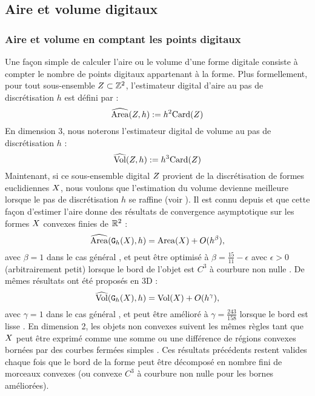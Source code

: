\subsection{Aire et volume digitaux}
%
\subsubsection{Aire et volume en comptant les points digitaux}
\label{sec:AreaByCounting}
Une façon simple de calculer l'aire ou le volume d'une forme digitale consiste à
compter le nombre de points digitaux appartenant à la forme. Plus formellement,
pour tout sous-ensemble $Z \subset \mathbb{Z}^2$, l'estimateur digital d'aire au pas
de discrétisation $h$ est défini par :
%
\begin{equation}
  \widehat{\mathrm{Area}}(Z, h) := h^2 \mathrm{Card}(Z)
\end{equation}
%
En dimension $3$, nous noterons l'estimateur digital de volume au pas de
discrétisation $h$ :
%
\begin{equation}
  \widehat{\mathrm{Vol}}(Z, h) := h^3 \mathrm{Card}(Z)
\end{equation}
%
Maintenant, si ce sous-ensemble digital $Z$ provient de la discrétisation de
formes euclidiennes $X$, nous voulons que l'estimation du volume devienne
meilleure lorsque le pas de discrétisation $h$ se raffine (voir
). Il est connu depuis
 et  que cette façon d'estimer l'aire donne
des résultats de convergence asymptotique sur les formes $X$ convexes
finies de $\mathbb{R}^2$ :
%
\begin{equation}
  \label{eq:AreaByCountingConv}
  \widehat{\mathrm{Area}}(\mathtt{G}_{h}(X),h) = \mathrm{Area}(X) + O(h^\beta),
\end{equation}
%
avec $\beta = 1$ dans le cas général \cite{Klette2000}, et peut être optimisé à
$\beta = \frac{15}{11} - \epsilon$ avec $\epsilon > 0$ (arbitrairement petit)
lorsque le bord de l'objet est $C^3$ à courbure non nulle \cite{Huxley1990}.
De mêmes résultats ont été proposés en 3D :
%
\begin{equation}
  \label{eq:VolumeByCountingConv}
  \widehat{\mathrm{Vol}}(\mathtt{G}_{h}(X),h) = \mathrm{Vol}(X) + O(h^\gamma),
\end{equation}
%
avec $\gamma = 1$ dans le cas général \cite{Kratzel1988}, et peut être amélioré à
$\gamma=\frac{243}{158}$ lorsque le bord est lisse \cite{Guo2010}.
%
En dimension 2, les objets non convexes suivent les mêmes règles tant que
$X$ peut être exprimé comme une somme ou une différence de régions convexes
bornées par des courbes fermées simples \cite{Huxley1996}. Ces résultats
précédents restent valides chaque fois que le bord de la forme peut être
décomposé en nombre fini de morceaux convexes (ou convexe $C^3$ à courbure non
nulle pour les bornes améliorées).
%
